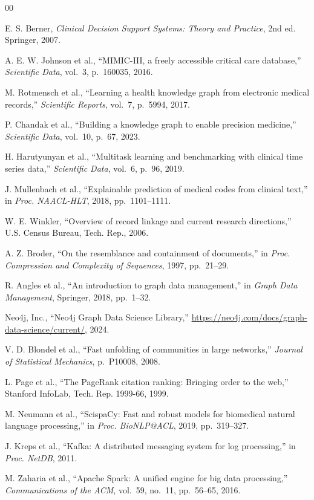 \documentclass[conference]{IEEEtran}
\begin{document}
\begin{thebibliography}{00}

E. S. Berner, \textit{Clinical Decision Support Systems: Theory and Practice},
2nd ed. Springer, 2007.

A. E. W. Johnson et al., ``MIMIC-III, a freely accessible critical care
database,'' \textit{Scientific Data}, vol.~3, p.~160035, 2016.

M. Rotmensch et al., ``Learning a health knowledge graph from electronic
medical records,'' \textit{Scientific Reports}, vol.~7, p.~5994, 2017.

P. Chandak et al., ``Building a knowledge graph to enable precision medicine,''
\textit{Scientific Data}, vol.~10, p.~67, 2023.

H. Harutyunyan et al., ``Multitask learning and benchmarking with clinical
time series data,'' \textit{Scientific Data}, vol.~6, p.~96, 2019.

J. Mullenbach et al., ``Explainable prediction of medical codes from clinical
text,'' in \textit{Proc. NAACL-HLT}, 2018, pp.~1101--1111.

W. E. Winkler, ``Overview of record linkage and current research directions,''
U.S. Census Bureau, Tech. Rep., 2006.

A. Z. Broder, ``On the resemblance and containment of documents,'' in
\textit{Proc. Compression and Complexity of Sequences}, 1997, pp.~21--29.

R. Angles et al., ``An introduction to graph data management,'' in
\textit{Graph Data Management}, Springer, 2018, pp.~1--32.

Neo4j, Inc., ``Neo4j Graph Data Science Library,''
\url{https://neo4j.com/docs/graph-data-science/current/}, 2024.

V. D. Blondel et al., ``Fast unfolding of communities in large networks,''
\textit{Journal of Statistical Mechanics}, p.~P10008, 2008.

L. Page et al., ``The PageRank citation ranking: Bringing order to the web,''
Stanford InfoLab, Tech. Rep. 1999-66, 1999.

M. Neumann et al., ``ScispaCy: Fast and robust models for biomedical natural
language processing,'' in \textit{Proc. BioNLP@ACL}, 2019, pp.~319--327.

J. Kreps et al., ``Kafka: A distributed messaging system for log processing,''
in \textit{Proc. NetDB}, 2011.

M. Zaharia et al., ``Apache Spark: A unified engine for big data processing,''
\textit{Communications of the ACM}, vol.~59, no.~11, pp.~56--65, 2016.

\end{thebibliography}
\end{document}

